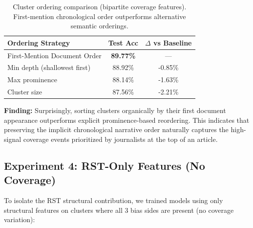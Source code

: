 \documentclass[11pt]{article}
\begin{document}
\begin{table}[h]
\centering
\begin{tabular}{lcc}
\toprule
\textbf{Ordering Strategy} & \textbf{Test Acc} & \textbf{$\Delta$ vs Baseline} \\
\midrule
First-Mention Document Order & \textbf{89.77\%} & --- \\
Min depth (shallowest first) & 88.92\% & -0.85\% \\
Max prominence & 88.14\% & -1.63\% \\
Cluster size & 87.56\% & -2.21\% \\
\bottomrule
\end{tabular}
\caption{Cluster ordering comparison (bipartite coverage features). First-mention chronological order outperforms alternative semantic orderings.}
\label{tab:ordering}
\end{table}

\textbf{Finding:} Surprisingly, sorting clusters organically by their first document appearance outperforms explicit prominence-based reordering. This indicates that preserving the implicit chronological narrative order naturally captures the high-signal coverage events prioritized by journalists at the top of an article.

\subsection{Experiment 4: RST-Only Features (No Coverage)}

To isolate the RST structural contribution, we trained models using only structural features on clusters where all 3 bias sides are present (no coverage variation):

\begin{table}[t]
\centering
{}
\caption{RST-only classification on size-3 clusters (no coverage signal). Best accuracy is 61.16\%, barely above chance.}
\label{tab:rst-only}
\end{table}
\end{document}
